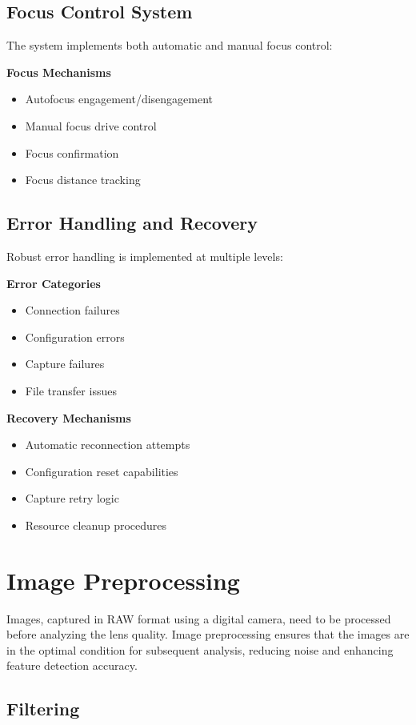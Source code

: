 \subsection{Focus Control System}
The system implements both automatic and manual focus control:

\textbf{Focus Mechanisms}
\begin{itemize}
    \item Autofocus engagement/disengagement
    \item Manual focus drive control
    \item Focus confirmation
    \item Focus distance tracking
\end{itemize}

\subsection{Error Handling and Recovery}
Robust error handling is implemented at multiple levels:

\textbf{Error Categories}
\begin{itemize}
    \item Connection failures
    \item Configuration errors
    \item Capture failures
    \item File transfer issues
\end{itemize}

\textbf{Recovery Mechanisms}
\begin{itemize}
    \item Automatic reconnection attempts
    \item Configuration reset capabilities
    \item Capture retry logic
    \item Resource cleanup procedures
\end{itemize}

\section{Image Preprocessing}
Images, captured in RAW format using a digital camera, need to be processed before analyzing the lens quality. Image preprocessing ensures that the images are in the optimal condition for subsequent analysis, reducing noise and enhancing feature detection accuracy.

\subsection{Filtering}


